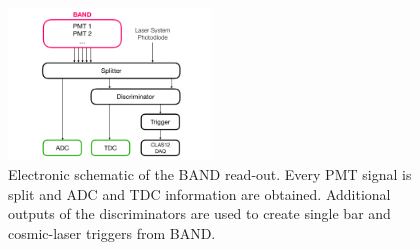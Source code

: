 \documentclass[3p,final,twocolumn]{elsarticle}
\begin{document}
\begin{figure}[tb]
	\centering
	\includegraphics[width=0.48\textwidth]{electronics-diag.pdf}
	\caption{Electronic schematic of the BAND read-out. Every PMT signal is split and ADC and TDC information are obtained. Additional outputs of the discriminators are used to create single bar and cosmic-laser triggers from BAND.}
	\label{fig:electronic-diag}
\end{figure}


\end{document}
